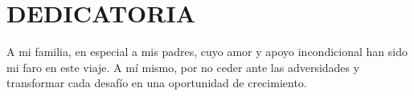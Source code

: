 \frontmatter

\chapter*{\centering \large DEDICATORIA}

\vspace{\baselineskip} %

\begin{flushright} %
\begin{minipage}{0.6\textwidth} %
\raggedleft %
A mi familia, en especial a mis padres, cuyo amor y apoyo incondicional han sido mi faro en este viaje. A mí mismo, por no ceder ante las adversidades y transformar cada desafío en una oportunidad de crecimiento.
\end{minipage}
\end{flushright}

\doublespacing %


